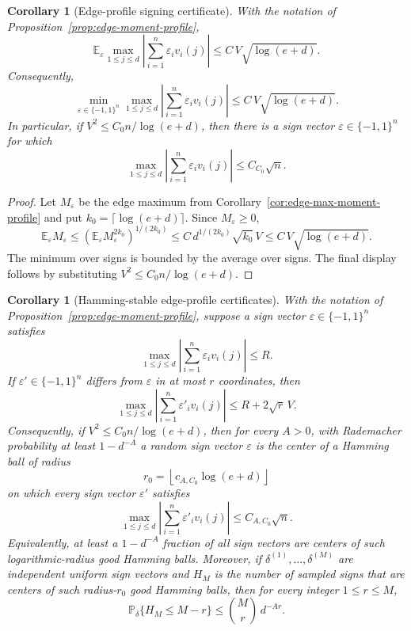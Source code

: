 \documentclass[11pt]{amsart}
\numberwithin{equation}{section}
\newtheorem{corollary}[theorem]{Corollary}
\theoremstyle{definition}
\theoremstyle{remark}
\newcommand{\Prob}{\mathbb P}
\newcommand{\Exp}{\mathbb E}
\newcommand{\eps}{\varepsilon}
\begin{document}
\begin{corollary}[Edge-profile signing certificate]
\label{cor:edge-profile-certificate}
With the notation of Proposition~\ref{prop:edge-moment-profile},
\[
  \Exp_\eps\max_{1\le j\le d}\left|\sum_{i=1}^n\eps_i v_i(j)\right|
  \le C\,V\sqrt{\log(e+d)} .
\]
Consequently,
\[
  \min_{\eps\in\{-1,1\}^n}
  \max_{1\le j\le d}\left|\sum_{i=1}^n\eps_i v_i(j)\right|
  \le C\,V\sqrt{\log(e+d)} .
\]
In particular, if \(V^2\le C_0n/\log(e+d)\), then there is a sign vector
\(\eps\in\{-1,1\}^n\) for which
\[
  \max_{1\le j\le d}\left|\sum_{i=1}^n\eps_i v_i(j)\right|
  \le C_{C_0}\sqrt n .
\]
\end{corollary}

\begin{proof}
Let \(M_\eps\) be the edge maximum from
Corollary~\ref{cor:edge-max-moment-profile} and put
\(k_0=\lceil\log(e+d)\rceil\).  Since \(M_\eps\ge0\),
\[
  \Exp_\eps M_\eps\le
  \left(\Exp_\eps M_\eps^{2k_0}\right)^{1/(2k_0)}
  \le C\,d^{1/(2k_0)}\sqrt{k_0}\,V
  \le C\,V\sqrt{\log(e+d)} .
\]
The minimum over signs is bounded by the average over signs.  The final display
follows by substituting \(V^2\le C_0n/\log(e+d)\).
\end{proof}

\begin{corollary}[Hamming-stable edge-profile certificates]
\label{cor:edge-profile-hamming}
With the notation of Proposition~\ref{prop:edge-moment-profile}, suppose a sign
vector \(\eps\in\{-1,1\}^n\) satisfies
\[
  \max_{1\le j\le d}\left|\sum_{i=1}^n\eps_i v_i(j)\right|\le R .
\]
If \(\eps'\in\{-1,1\}^n\) differs from \(\eps\) in at most \(r\) coordinates,
then
\[
  \max_{1\le j\le d}\left|\sum_{i=1}^n\eps'_i v_i(j)\right|
  \le R+2\sqrt r\,V .
\]
Consequently, if \(V^2\le C_0n/\log(e+d)\), then for every \(A>0\), with
Rademacher probability at least \(1-d^{-A}\) a random sign vector \(\eps\) is
the center of a Hamming ball of radius
\[
  r_0=\left\lfloor c_{A,C_0}\log(e+d)\right\rfloor
\]
on which every sign vector \(\eps'\) satisfies
\[
  \max_{1\le j\le d}\left|\sum_{i=1}^n\eps'_i v_i(j)\right|
  \le C_{A,C_0}\sqrt n .
\]
Equivalently, at least a \(1-d^{-A}\) fraction of all sign vectors are centers
of such logarithmic-radius good Hamming balls.
Moreover, if \(\delta^{(1)},\ldots,\delta^{(M)}\) are independent uniform sign
vectors and \(H_M\) is the number of sampled signs that are centers of such
radius-\(r_0\) good Hamming balls, then for every integer \(1\le r\le M\),
\[
  \Prob_\delta\{H_M\le M-r\}\le \binom{M}{r}\,d^{-Ar}.
\]
\end{corollary}
\end{document}
